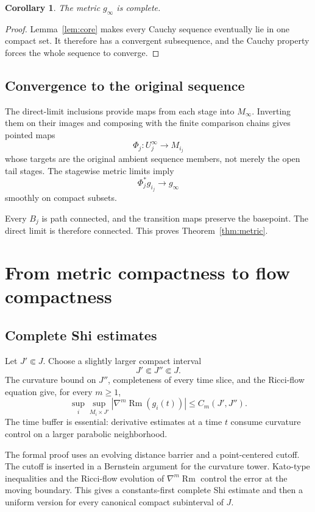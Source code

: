 \documentclass[11pt]{article}
\theoremstyle{plain}
\newtheorem{corollary}[theorem]{Corollary}
\theoremstyle{definition}
\theoremstyle{remark}
\newcommand{\Rm}{\operatorname{Rm}}
\newcommand{\norm}[1]{\left|#1\right|}
\begin{document}
\begin{corollary}
The metric \(g_\infty\) is complete.
\end{corollary}

\begin{proof}
Lemma~\ref{lem:core} makes every Cauchy sequence eventually lie in one
compact set.  It therefore has a convergent subsequence, and the Cauchy
property forces the whole sequence to converge.
\end{proof}

\subsection{Convergence to the original sequence}

The direct-limit inclusions provide maps from each stage into \(M_\infty\).
Inverting them on their images and composing with the finite comparison
chains gives pointed maps
\[
  \Phi_j:U_j^\infty\longrightarrow M_{i_j}
\]
whose targets are the original ambient sequence members, not merely the open
tail stages.  The stagewise metric limits imply
\[
  \Phi_j^*g_{i_j}\longrightarrow g_\infty
\]
smoothly on compact subsets.

Every \(B_j\) is path connected, and the transition maps preserve the
basepoint.  The direct limit is therefore connected.  This proves
Theorem~\ref{thm:metric}.

\section{From metric compactness to flow compactness}

\subsection{Complete Shi estimates}

Let \(J'\Subset J\).  Choose a slightly larger compact interval
\[
  J'\Subset J''\Subset J.
\]
The curvature bound on \(J''\), completeness of every time slice, and the
Ricci-flow equation give, for every \(m\geq1\),
\[
  \sup_i\sup_{M_i\times J'}
  \norm{\nabla^m\Rm(g_i(t))}
  \leq C_m(J',J'').
\]
The time buffer is essential: derivative estimates at a time \(t\) consume
curvature control on a larger parabolic neighborhood.

The formal proof uses an evolving distance barrier and a point-centered
cutoff.  The cutoff is inserted in a Bernstein argument for the curvature
tower.  Kato-type inequalities and the Ricci-flow evolution of
\(\nabla^m\Rm\) control the error at the moving boundary.  This gives a
constants-first complete Shi estimate and then a uniform version for every
canonical compact subinterval of \(J\).
\end{document}
